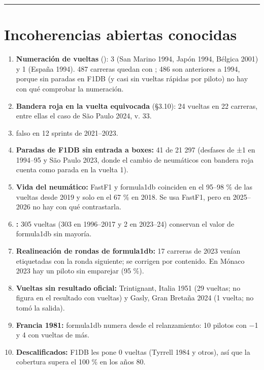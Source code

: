 \medskip\noindent\textcolor{muted!40}{\rule{\linewidth}{0.3pt}}\medskip

\section{Incoherencias abiertas conocidas}

\begin{enumerate}
\item \textbf{Numeración de vueltas} (): 3  (San Marino 1994, Japón 1994, Bélgica 2001) y 1  (España 1994). 487 carreras quedan con ; 486 son anteriores a 1994, porque sin paradas en F1DB (y casi sin vueltas rápidas por piloto) no hay con qué comprobar la numeración.
\item \textbf{Bandera roja en la vuelta equivocada} (§3.10): 24 vueltas en 22 carreras, entre ellas el caso de São Paulo 2024, v. 33.
\item \textbf{} falso en 12 sprints de 2021–2023.
\item \textbf{Paradas de F1DB sin entrada a boxes:} 41 de 21 297 (desfases de ±1 en 1994–95 y São Paulo 2023, donde el cambio de neumáticos con bandera roja cuenta como parada en la vuelta 1).
\item \textbf{Vida del neumático:} FastF1 y formula1db coinciden en el 95–98 \% de las vueltas desde 2019 y solo en el 67 \% en 2018. Se usa FastF1, pero en 2025–2026 no hay con qué contrastarla.
\item \textbf{:} 305 vueltas (303 en 1996–2017 y 2 en 2023–24) conservan el valor de formula1db sin mayoría.
\item \textbf{Realineación de rondas de formula1db:} 17 carreras de 2023 venían etiquetadas con la ronda siguiente; se corrigen por contenido. En Mónaco 2023 hay un piloto sin emparejar (95 \%).
\item \textbf{Vueltas sin resultado oficial:} Trintignant, Italia 1951 (29 vueltas; no figura en el resultado con vueltas) y Gasly, Gran Bretaña 2024 (1 vuelta; no tomó la salida).
\item \textbf{Francia 1981:} formula1db numera desde el relanzamiento: 10 pilotos con −1 y 4 con vueltas de más.
\item \textbf{Descalificados:} F1DB les pone 0 vueltas (Tyrrell 1984 y otros), así que la cobertura supera el 100 \% en los años 80.

\end{enumerate}
